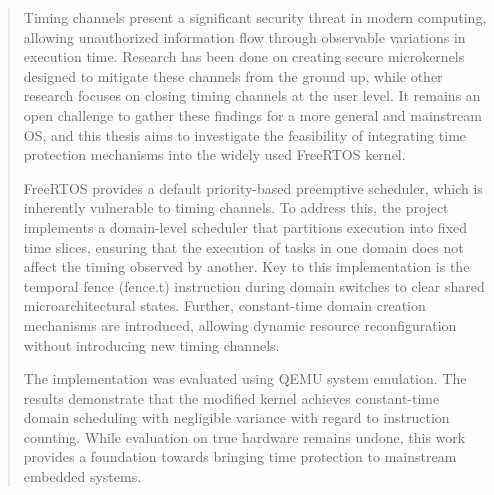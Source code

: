 \begin{abstract}
Timing channels present a significant security threat in modern computing,
allowing unauthorized information flow through observable variations in
execution time. Research has been done on creating secure microkernels designed
to mitigate these channels from the ground up, while other research focuses on
closing timing channels at the user level. It remains an open challenge to
gather these findings for a more general and mainstream OS, and this thesis
aims to investigate the feasibility of integrating time protection mechanisms
into the widely used FreeRTOS kernel.

FreeRTOS provides a default priority-based preemptive scheduler, which is
inherently vulnerable to timing channels. To address this, the project
implements a domain-level scheduler that partitions execution into
fixed time slices, ensuring that the execution of tasks in one domain does not
affect the timing observed by another. Key to this implementation is the
temporal fence (fence.t) instruction during domain switches to clear shared
microarchitectural states. Further, constant-time domain creation mechanisms
are introduced, allowing dynamic resource reconfiguration without introducing
new timing channels.

The implementation was evaluated using QEMU system emulation. The results
demonstrate that the modified kernel achieves constant-time domain scheduling
with negligible variance with regard to instruction counting. While evaluation
on true hardware remains undone, this work provides a foundation towards
bringing time protection to mainstream embedded systems.
\end{abstract}

